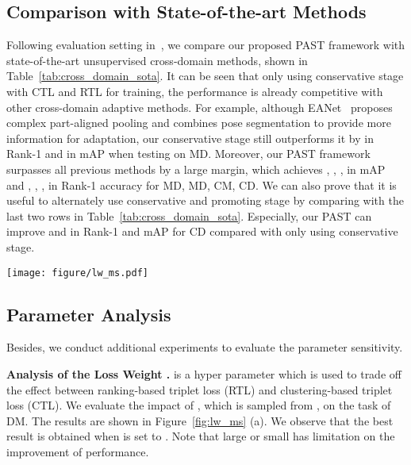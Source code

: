 \documentclass[10pt,twocolumn,letterpaper]{article}
\begin{document}
\subsection{Comparison with State-of-the-art Methods}
Following evaluation setting in~\cite{EANet, HHL}, we compare our proposed PAST framework with state-of-the-art unsupervised cross-domain methods, shown in Table~\ref{tab:cross_domain_sota}.
It can be seen that only using conservative stage with CTL and RTL for training, the performance is already competitive with other cross-domain adaptive methods. 
For example, although EANet~\cite{EANet} proposes complex part-aligned pooling and combines pose segmentation to provide more information for adaptation, our conservative stage still outperforms it by  in Rank-1 and  in mAP when testing on MD. 
Moreover, our PAST framework surpasses all previous methods by a large margin, which achieves , , ,  in mAP and , , ,  in Rank-1 accuracy for MD, MD, CM, CD. 
We can also prove that it is useful to alternately use conservative and promoting stage by comparing with the last two rows in Table~\ref{tab:cross_domain_sota}. 
Especially, our PAST can improve  and  in Rank-1 and mAP for CD compared with only using conservative stage.

\begin{figure*}[h]
\centering
\texttt{[image: figure/lw\_ms.pdf]}
\setlength{\abovecaptionskip}{-0.35cm} 
\setlength{\belowcaptionskip}{-0.6cm}
\caption{Analysis of hyper parameters on DM setting. (a): The impact of the loss weight ; (b): The impact of the minimum samples  at each cluster in HDBSCAN clustering method; (c): The number of clusters from HDBSCAN with different minimum sample .}
\label{fig:lw_ms}
\end{figure*}

\subsection{Parameter Analysis}
Besides, we conduct additional experiments to evaluate the parameter sensitivity.

\textbf{Analysis of the Loss Weight .}
 is a hyper parameter which is used to trade off the effect between ranking-based triplet loss (RTL) and clustering-based triplet loss (CTL). 
We evaluate the impact of , which is sampled from , on the task of DM. 
The results are shown in Figure~\ref{fig:lw_ms} (a). 
We observe that the best result is obtained when  is set to . Note that large or small  has limitation on the improvement of performance.
\end{document}
